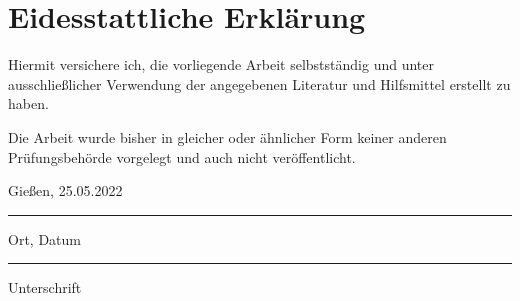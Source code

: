\section*{Eidesstattliche Erklärung}
	\vspace{1cm}
	Hiermit versichere ich, die vorliegende Arbeit selbstständig und unter ausschließlicher Verwendung der angegebenen Literatur und Hilfsmittel erstellt zu haben.
	
	Die Arbeit wurde bisher in gleicher oder ähnlicher Form keiner anderen Prüfungsbehörde vorgelegt und auch nicht veröffentlicht.
	
	\vspace{2cm}
	\parbox{6cm}{\centering Gießen, 25.05.2022\hrule
		\strut \centering\footnotesize Ort, Datum} \hfill\parbox{6cm}{\hrule
		\strut \centering\footnotesize Unterschrift}
